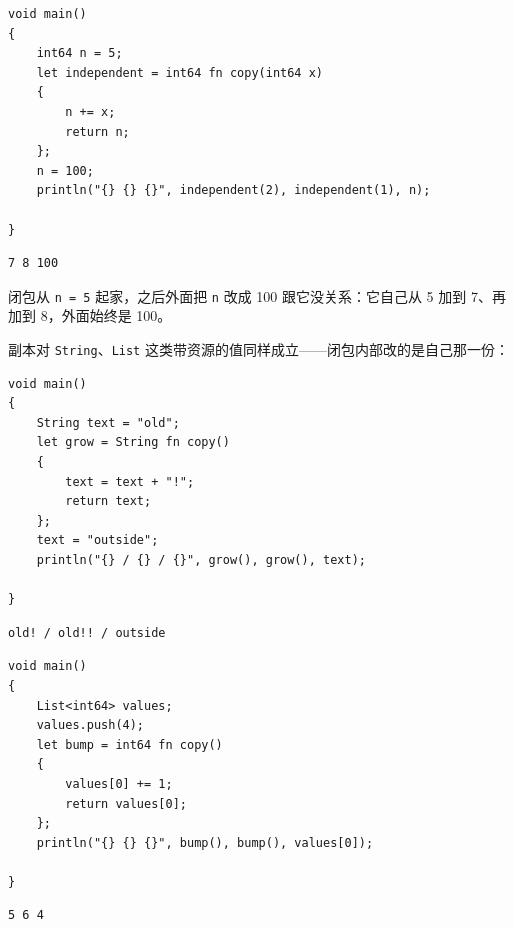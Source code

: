 \par
\medskip
\begin{lstlisting}[style=chali]
void main()
{
    int64 n = 5;
    let independent = int64 fn copy(int64 x)
    {
        n += x;
        return n;
    };
    n = 100;
    println("{} {} {}", independent(2), independent(1), n);

}
\end{lstlisting}
\par
\medskip

\par
\medskip
\begin{lstlisting}[style=out]
7 8 100
\end{lstlisting}
\par
\medskip

闭包从 \texttt{n =\allowbreak{} 5} 起家，之后外面把 \texttt{n} 改成 100 跟它没关系：它自己从 5 加到 7、再加到 8，外面始终是 100。

副本对 \texttt{String}、\texttt{List} 这类带资源的值同样成立——闭包内部改的是自己那一份：

\par
\medskip
\begin{lstlisting}[style=chali]
void main()
{
    String text = "old";
    let grow = String fn copy()
    {
        text = text + "!";
        return text;
    };
    text = "outside";
    println("{} / {} / {}", grow(), grow(), text);

}
\end{lstlisting}
\par
\medskip

\par
\medskip
\begin{lstlisting}[style=out]
old! / old!! / outside
\end{lstlisting}
\par
\medskip

\par
\medskip
\begin{lstlisting}[style=chali]
void main()
{
    List<int64> values;
    values.push(4);
    let bump = int64 fn copy()
    {
        values[0] += 1;
        return values[0];
    };
    println("{} {} {}", bump(), bump(), values[0]);

}
\end{lstlisting}
\par
\medskip

\par
\medskip
\begin{lstlisting}[style=out]
5 6 4
\end{lstlisting}
\par
\medskip

